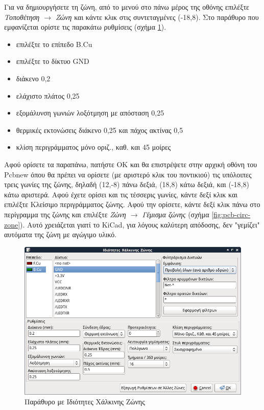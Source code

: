 \documentclass[a4paper]{article}
\begin{document}
Για να δημιουργήσετε τη ζώνη, από το μενού στο πάνω μέρος της οθόνης επιλέξτε \textit{Τοποθέτηση $\rightarrow$ Ζώνη} και κάντε κλικ στις συντεταγμένες (-18,8). Στο παράθυρο που εμφανίζεται ορίστε τις παρακάτω ρυθμίσεις (σχήμα \ref{fig:pcb-wind-gndzone}).


\begin{itemize}
    \item επιλέξτε το επίπεδο B.Cu
    \item επιλέξτε το δίκτυο GND
    \item διάκενο 0,2
    \item ελάχιστο πλάτος 0,25
    \item εξομάλυνση γωνιών λοξότμηση με απόσταση 0,25
    \item θερμικές εκτονώσεις διάκενο 0,25 και πάχος ακτίνας 0,5
    \item κλίση περιγράμματος μόνο οριζ., καθ. και 45 μοίρες
\end{itemize}

Αφού ορίσετε τα παραπάνω, πατήστε ΟΚ και θα επιστρέψετε στην αρχική οθόνη του Pcbnew όπου θα πρέπει να ορίσετε (με αριστερό κλικ του ποντικιού) τις υπόλοιπες τρεις γωνίες της ζώνης, δηλαδή (12,-8) πάνω δεξιά, (18,8) κάτω δεξιά, και (-18,8) κάτω αριστερά. Αφού έχετε ορίσει και τις τέσσερις γωνίες, κάντε δεξί κλικ και επιλέξτε Κλείσιμο περιγράμματος ζώνης. Αφού την ορίσετε, κάντε δεξί κλικ πάνω στο περίγραμμα της ζώνης και επιλέξτε \textit{Ζώνη $\rightarrow$ Γέμισμα ζώνης} (σχήμα \ref{fig:pcb-circ-zone}). Αυτό χρειάζεται γιατί το KiCad, για λόγους καλύτερη απόδοσης, δεν "γεμίζει" αυτόματα της ζώνη με αγώγιμο υλικό.

\begin{figure}
  \begin{center}
    \includegraphics[width=.9\textwidth]{img/pcb-wind-gndzone.png}
    \caption{Παράθυρο με Ιδιότητες Χάλκινης Ζώνης}
    \label{fig:pcb-wind-gndzone}
  \end{center}
\end{figure}
\end{document}
